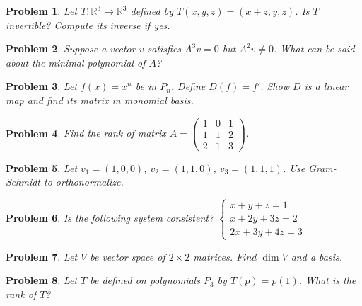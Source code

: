 \documentclass[11pt]{article}
\theoremstyle{upright}
\newtheorem{problem}{Problem}
\begin{document}
\begin{problem}
Let $T: \mathbb{R}^3 \to \mathbb{R}^3$ defined by $T(x,y,z) = (x+z, y, z)$. Is $T$ invertible? Compute its inverse if yes.
\end{problem}

\begin{problem}
Suppose a vector $v$ satisfies $A^3v = 0$ but $A^2v \neq 0$. What can be said about the minimal polynomial of $A$?
\end{problem}

\begin{problem}
Let $f(x) = x^n$ be in $P_n$. Define $D(f) = f'$. Show $D$ is a linear map and find its matrix in monomial basis.
\end{problem}

\begin{problem}
Find the rank of matrix $A = \begin{pmatrix}1 & 0 & 1 \\ 1 & 1 & 2 \\ 2 & 1 & 3\end{pmatrix}$.
\end{problem}

\begin{problem}
Let $v_1 = (1,0,0)$, $v_2 = (1,1,0)$, $v_3 = (1,1,1)$. Use Gram-Schmidt to orthonormalize.
\end{problem}

\begin{problem}
Is the following system consistent? 
$
\begin{cases}
x + y + z = 1 \\
x + 2y + 3z = 2 \\
2x + 3y + 4z = 3
\end{cases}
$
\end{problem}

\begin{problem}
Let $V$ be vector space of $2\times 2$ matrices. Find $\dim V$ and a basis.
\end{problem}

\begin{problem}
Let $T$ be defined on polynomials $P_3$ by $T(p) = p(1)$. What is the rank of $T$?
\end{problem}
\end{document}

